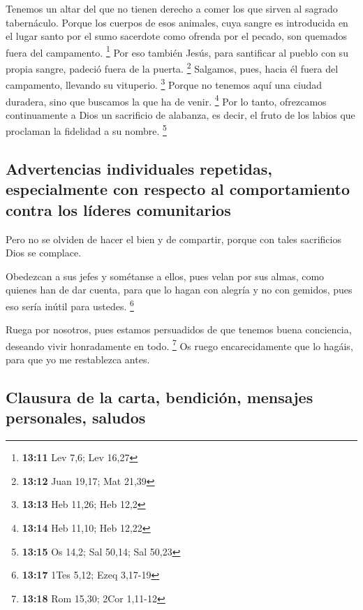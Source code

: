  Tenemos un altar del que no tienen derecho a comer los
que sirven al sagrado tabernáculo.  Porque los cuerpos de
esos animales, cuya sangre es introducida en el lugar santo por el sumo
sacerdote como ofrenda por el pecado, son quemados fuera del campamento.
\footnote{\textbf{13:11} Lev 7,6; Lev 16,27}  Por eso
también Jesús, para santificar al pueblo con su propia sangre, padeció
fuera de la puerta. \footnote{\textbf{13:12} Juan 19,17; Mat 21,39}
 Salgamos, pues, hacia él fuera del campamento, llevando
su vituperio. \footnote{\textbf{13:13} Heb 11,26; Heb 12,2}
 Porque no tenemos aquí una ciudad duradera, sino que
buscamos la que ha de venir. \footnote{\textbf{13:14} Heb 11,10; Heb
  12,22}  Por lo tanto, ofrezcamos continuamente a Dios
un sacrificio de alabanza, es decir, el fruto de los labios que
proclaman la fidelidad a su nombre. \footnote{\textbf{13:15} Os 14,2;
  Sal 50,14; Sal 50,23}

\hypertarget{advertencias-individuales-repetidas-especialmente-con-respecto-al-comportamiento-contra-los-luxedderes-comunitarios}{%
\subsection{Advertencias individuales repetidas, especialmente con
respecto al comportamiento contra los líderes
comunitarios}\label{advertencias-individuales-repetidas-especialmente-con-respecto-al-comportamiento-contra-los-luxedderes-comunitarios}}

 Pero no se olviden de hacer el bien y de compartir,
porque con tales sacrificios Dios se complace.

 Obedezcan a sus jefes y sométanse a ellos, pues velan
por sus almas, como quienes han de dar cuenta, para que lo hagan con
alegría y no con gemidos, pues eso sería inútil para ustedes.
\footnote{\textbf{13:17} 1Tes 5,12; Ezeq 3,17-19}

 Ruega por nosotros, pues estamos persuadidos de que
tenemos buena conciencia, deseando vivir honradamente en todo.
\footnote{\textbf{13:18} Rom 15,30; 2Cor 1,11-12}  Os
ruego encarecidamente que lo hagáis, para que yo me restablezca antes.

\hypertarget{clausura-de-la-carta-bendiciuxf3n-mensajes-personales-saludos}{%
\subsection{Clausura de la carta, bendición, mensajes personales,
saludos}\label{clausura-de-la-carta-bendiciuxf3n-mensajes-personales-saludos}}

